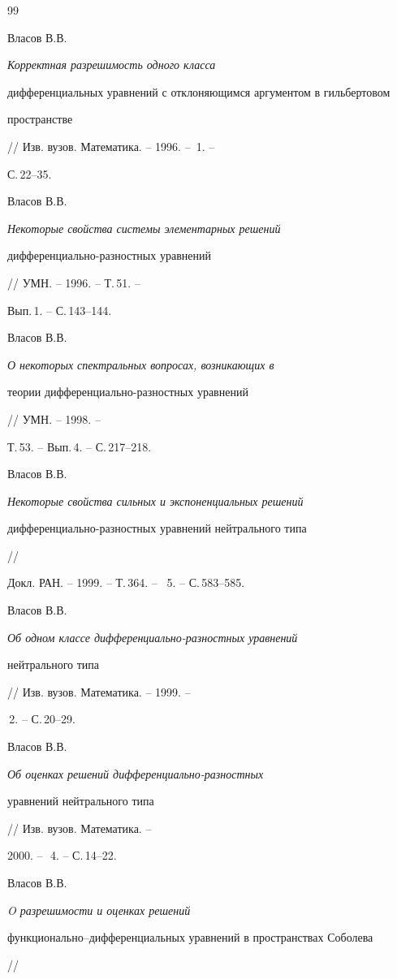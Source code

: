 \begin{thebibliography}{99} 


 




Власов В.В. {\em Корректная разрешимость одного класса 


дифференциальных уравнений с отклоняющимся аргументом в гильбертовом 


пространстве} // Изв. вузов. Математика. -- 1996. -- \No\,1. -- 


С.\,22--35. 




Власов В.В. {\em Некоторые свойства системы элементарных решений 


дифференциально-разностных уравнений} // УМН. -- 1996. -- Т.\,51. -- 


Вып.\,1. -- С.\,143--144. 




Власов В.В. {\em О некоторых спектральных вопросах, возникающих в 


теории дифференциально-разностных уравнений} // УМН. -- 1998. -- 


Т.\,53. -- Вып.\,4. -- С.\,217--218. 




Власов В.В. {\em Некоторые свойства сильных и экспоненциальных решений 


дифференциально-разностных уравнений нейтрального типа} // 


Докл. РАН. -- 1999. -- Т.\,364. -- \No\, 5. -- С.\,583--585. 




Власов В.В. {\em Об одном классе дифференциально-разностных уравнений 


нейтрального типа} // Изв. вузов. Математика. -- 1999. -- 


\No\,2. -- С.\,20--29. 




Власов В.В. {\em Об оценках решений дифференциально-разностных 


уравнений нейтрального типа} // Изв. вузов. Математика. -- 


2000. -- \No\,\,4. -- С.\,14--22. 




Власов В.В. {\em O разрешимости и оценках решений 


функционально--дифференциальных уравнений в пространствах Соболева} // 



\end{thebibliography}
